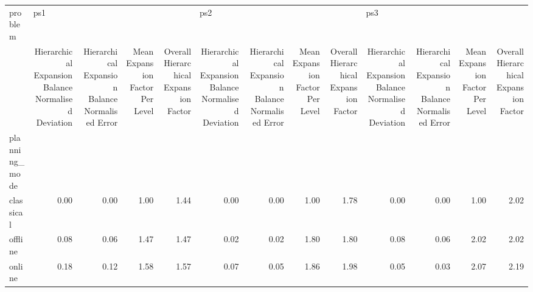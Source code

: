 \begin{tabular}{lrrrrrrrrrrrr}
\toprule
problem & \multicolumn{4}{l}{ps1} & \multicolumn{4}{l}{ps2} & \multicolumn{4}{l}{ps3} \\
{} & Hierarchical Expansion Balance Normalised Deviation & Hierarchical Expansion Balance Normalised Error & Mean Expansion Factor Per Level & Overall Hierarchical Expansion Factor & Hierarchical Expansion Balance Normalised Deviation & Hierarchical Expansion Balance Normalised Error & Mean Expansion Factor Per Level & Overall Hierarchical Expansion Factor & Hierarchical Expansion Balance Normalised Deviation & Hierarchical Expansion Balance Normalised Error & Mean Expansion Factor Per Level & Overall Hierarchical Expansion Factor \\
planning\_mode &                                                     &                                                 &                                 &                                       &                                                     &                                                 &                                 &                                       &                                                     &                                                 &                                 &                                       \\
\midrule
classical     &                                               0.00 &                                            0.00 &                            1.00 &                                  1.44 &                                               0.00 &                                            0.00 &                            1.00 &                                  1.78 &                                               0.00 &                                            0.00 &                            1.00 &                                  2.02 \\
offline       &                                               0.08 &                                            0.06 &                            1.47 &                                  1.47 &                                               0.02 &                                            0.02 &                            1.80 &                                  1.80 &                                               0.08 &                                            0.06 &                            2.02 &                                  2.02 \\
online        &                                               0.18 &                                            0.12 &                            1.58 &                                  1.57 &                                               0.07 &                                            0.05 &                            1.86 &                                  1.98 &                                               0.05 &                                            0.03 &                            2.07 &                                  2.19 \\
\bottomrule
\end{tabular}
